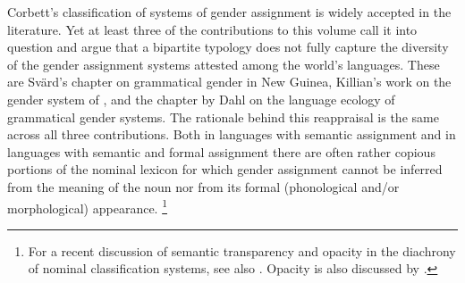 \documentclass[output=collectionpaper]{langsci/langscibook}
\begin{document}
Corbett's classification of systems of gender assignment is widely accepted in the literature. Yet at least three of the contributions to this volume call it into question and argue that a bipartite typology does not fully capture the diversity of the gender assignment systems attested among the world's languages. These are Svärd's chapter on grammatical gender in New Guinea, Killian's work on the gender system of , and the chapter by Dahl on the language ecology of grammatical gender systems. The rationale behind this reappraisal is the same across all three contributions. Both in languages with semantic assignment and in languages with semantic and formal assignment there are often rather copious portions of the nominal lexicon for which gender assignment cannot be inferred from the meaning of the noun nor from its formal (phonological and/or morphological) appearance.%
\footnote{%
For a recent discussion of semantic transparency and opacity in the diachrony of nominal classification systems, see also \cite{Seifart2018}. Opacity is also discussed by \cite{Passer2016b}.
}%
\end{document}
